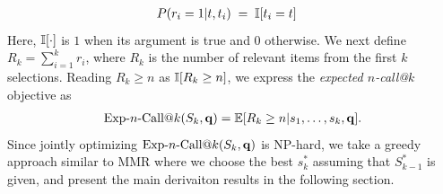 \begin{align*}
P(r_{i}=1|t, t_{i}) & \; = \; \mathbb{I}[t_{i} = t]
\end{align*}
Here, $\mathbb{I}[\cdot]$ is $1$ when its argument is true and $0$ otherwise.
We next define $R_k = \sum_{i=1}^k r_i$, where $R_k$ is 
the number of relevant items from the first $k$ selections.  
Reading $R_k \geq n$ as $\mathbb{I}[R_k \geq n]$, 
we express the \emph{expected $n$-call@$k$} objective as 
\begin{align}
\label{eq:setRelevance}
  \ExpNCall{n}(S_k,\vec{q})
  = \mathbb{E}[R_k\geq n|s_1,\dots,s_k,\vec{q}] .  
\end{align}
Since jointly optimizing $\ExpNCall{n}(S_k,\vec{q})$ is NP-hard, we
take a greedy approach similar to MMR where we choose the best $s_k^*$
assuming that $S_{k-1}^*$ is given, and present the main derivaiton results in the following section. 
